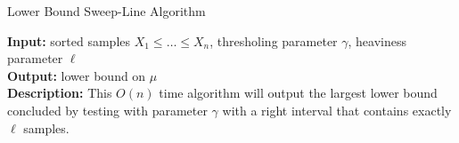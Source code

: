 \begin{algorithm}[!hp]
    \caption{Lower Bound Sweep-Line Algorithm} \label{algo:sweep}
    \hspace*{\algorithmicindent} 
    \begin{flushleft}
      {\bf Input:} sorted samples $X_1 \le \dots \le X_n$, thresholing parameter $\gamma$, heaviness parameter $\ell$ \\
      {\bf Output:} lower bound on $\mu$\\
      {\bf Description:} This $O(n)$ time algorithm will output the largest lower bound concluded by testing with parameter $\gamma$ with a right interval that contains exactly $\ell$ samples.
    \end{flushleft}
    \begin{algorithmic}[1]
    


\end{algorithmic}
\end{algorithm}
